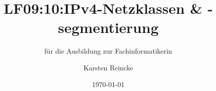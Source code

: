 \documentclass[]{beamer}
\title{LF09:10:IPv4-Netzklassen \& -segmentierung}
\subtitle{für die Ausbildung zur Fachinformatikerin}
\institute[GS-LDK]{Gewerbliche Schulen Dillenburg}
\author{Karsten Reincke}
\date{\today}
\def\cfgGl{../../../cfg.gl/}
\begin{document}

\begin{frame}
  \titlepage

  
\end{frame}






\logo{}
\newpage



%
\end{document}
